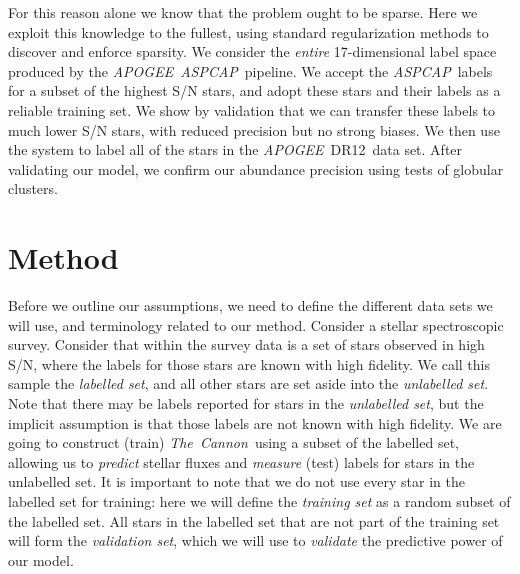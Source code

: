 \documentclass[12pt,preprint]{aastex}
\newcommand{\project}[1]{\textsl{#1}}
\newcommand{\TheCannon}{\project{The~Cannon}}
\newcommand{\acronym}[1]{{\small{#1}}}
\newcommand{\apogee}{\project{\acronym{APOGEE}}}
\newcommand{\aspcap}{\project{\acronym{ASPCAP}}}
\newcommand{\dr}{\acronym{DR12}}
\begin{document}
For this reason alone we know that the problem ought to be sparse.  Here we exploit this 
knowledge to the fullest, using standard regularization methods to discover
and enforce sparsity.  We consider the \emph{entire} 17-dimensional label space 
produced by the \apogee\ \aspcap\ pipeline.  We accept the \aspcap\ labels for 
a subset of the highest S/N stars, and adopt these stars and their labels as a
reliable training set.  We show by validation that we can transfer these labels to much 
lower S/N stars, with reduced precision but no strong biases.  We then use the
system to label all of the stars in the \apogee\ \dr\ data set.  After
validating our model, we confirm our abundance precision using tests of globular
clusters.


\section{Method}


Before we outline our assumptions, we need to define the different data sets we
will use, and terminology related to our method. Consider a stellar spectroscopic
survey.  Consider that within the survey data is a set of stars observed in high S/N, where the labels for those stars are known with high
fidelity.  We call this sample the \emph{labelled set}, and all other stars
are set aside into the \emph{unlabelled set}.  Note that there may be labels
reported for stars in the \emph{unlabelled set}, but the implicit assumption is
that those labels are not known with high fidelity.  We are going to construct
(train) \TheCannon\ using a subset of the labelled set, allowing us to 
\emph{predict} stellar fluxes and \emph{measure} (test) labels for stars in the 
unlabelled set.  It is important to note that we do not use every star in the
labelled set for training: here we will define the \emph{training set} as a random
subset of the labelled set.  All stars in the labelled set that are not part of 
the training set will form the \emph{validation set}, which we will use to 
\emph{validate} the predictive power of our model.
\end{document}
